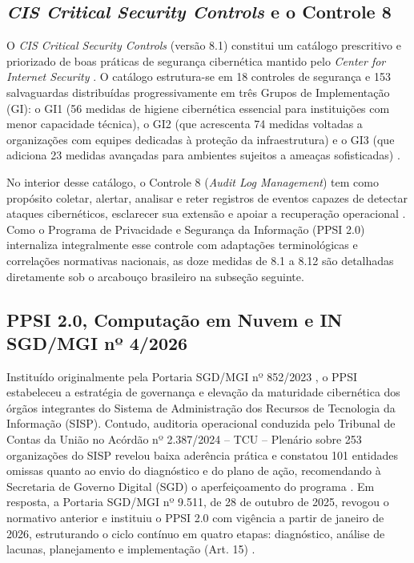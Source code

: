 \subsection{\textit{CIS Critical Security Controls} e o Controle 8}
\label{subsec:ref_cis_controls}

O \textit{CIS Critical Security Controls} (versão 8.1) constitui um catálogo prescritivo e priorizado de boas práticas de segurança cibernética mantido pelo \textit{Center for Internet Security} \cite{cis2024}. O catálogo estrutura-se em 18 controles de segurança e 153 salvaguardas distribuídas progressivamente em três Grupos de Implementação (GI): o GI1 (56 medidas de higiene cibernética essencial para instituições com menor capacidade técnica), o GI2 (que acrescenta 74 medidas voltadas a organizações com equipes dedicadas à proteção da infraestrutura) e o GI3 (que adiciona 23 medidas avançadas para ambientes sujeitos a ameaças sofisticadas) \cite{cis2024,ppsi2026}.

No interior desse catálogo, o Controle 8 (\textit{Audit Log Management}) tem como propósito coletar, alertar, analisar e reter registros de eventos capazes de detectar ataques cibernéticos, esclarecer sua extensão e apoiar a recuperação operacional \cite{cis2024,ppsi2026}. Como o Programa de Privacidade e Segurança da Informação (PPSI 2.0) internaliza integralmente esse controle com adaptações terminológicas e correlações normativas nacionais, as doze medidas de 8.1 a 8.12 são detalhadas diretamente sob o arcabouço brasileiro na subseção seguinte.

\subsection{PPSI 2.0, Computação em Nuvem e IN SGD/MGI nº 4/2026}
\label{subsec:ref_ppsi}

Instituído originalmente pela Portaria SGD/MGI nº 852/2023 \cite{portaria852_2023}, o PPSI estabeleceu a estratégia de governança e elevação da maturidade cibernética dos órgãos integrantes do Sistema de Administração dos Recursos de Tecnologia da Informação (SISP). Contudo, auditoria operacional conduzida pelo Tribunal de Contas da União no Acórdão nº 2.387/2024 -- TCU -- Plenário sobre 253 organizações do SISP revelou baixa aderência prática e constatou 101 entidades omissas quanto ao envio do diagnóstico e do plano de ação, recomendando à Secretaria de Governo Digital (SGD) o aperfeiçoamento do programa \cite{tcu2387_2024}. Em resposta, a Portaria SGD/MGI nº 9.511, de 28 de outubro de 2025, revogou o normativo anterior e instituiu o PPSI 2.0 com vigência a partir de janeiro de 2026, estruturando o ciclo contínuo em quatro etapas: diagnóstico, análise de lacunas, planejamento e implementação (Art. 15) \cite{portaria9511_2025}.

